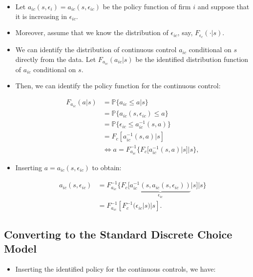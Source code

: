 \documentclass[]{book}
\providecommand{\tightlist}{%
  \setlength{\itemsep}{0pt}\setlength{\parskip}{0pt}}
\begin{document}
\begin{itemize}
\tightlist
\item
  Let \(a_{ic}(s, \epsilon_{i}) = a_{ic}(s, \epsilon_{ic})\) be the
  policy function of firm \(i\) and suppose that it is increasing in
  \(\epsilon_{ic}\).
\item
  Moreover, assume that we know the distribution of \(\epsilon_{ic}\),
  say, \(F_{\epsilon_c}(\cdot|s)\).
\item
  We can identify the distribution of continuous control \(a_{ic}\)
  conditional on \(s\) directly from the data. Let
  \(F_{a_{ic}}(a_{ic}|s)\) be the identified distribution function of
  \(a_{ic}\) conditional on \(s\).
\item
  Then, we can identify the policy function for the continuous control:

  \begin{equation}
  \begin{split}
  F_{a_{ic}}(a|s) &= \mathbb{P}\{a_{ic} \le a|s\}\\
  &= \mathbb{P}\{a_{ic}(s, \epsilon_{ic}) \le a\}\\
  &=\mathbb{P}\{\epsilon_{ic} \le a_{ic}^{-1}(s, a)\}\\
  &=F_c[a_{ic}^{-1}(s, a)|s]\\
  &\Leftrightarrow a = F_{a_{ic}}^{-1}\{F_c[a_{ic}^{-1}(s, a)|s]|s\},
  \end{split}
  \end{equation}
\item
  Inserting \(a = a_{ic}(s, \epsilon_{ic})\) to obtain:

  \begin{equation}
  \begin{split}
  a_{ic}(s, \epsilon_{ic}) &= F_{a_{ic}}^{-1}\{F_c[\underbrace{a_{ic}^{-1}(s, a_{ic}(s, \epsilon_{ic}))}_{\epsilon_{ic}}|s]|s\}\\
  & = F_{a_{ic}}^{-1}[F_c^{-1}(\epsilon_{ic}|s)|s].
  \end{split}
  \end{equation}
\end{itemize}

\subsection{Converting to the Standard Discrete Choice
Model}\label{converting-to-the-standard-discrete-choice-model}

\begin{itemize}
\tightlist
\item
  Inserting the identified policy for the continuous controls, we have:
\end{itemize}
\end{document}
